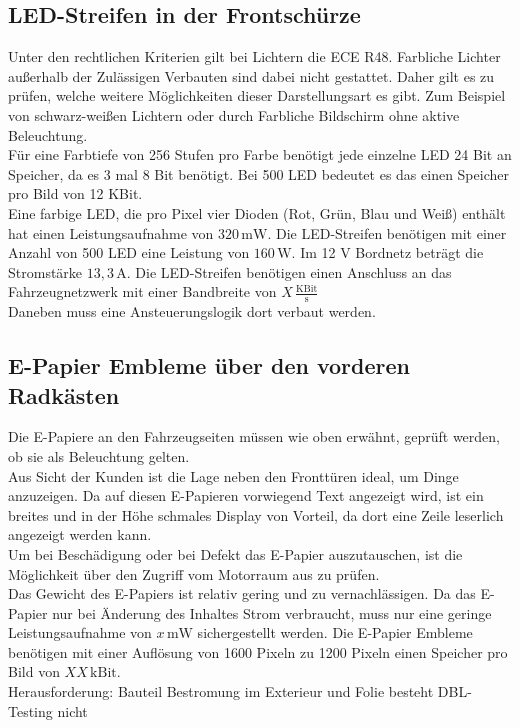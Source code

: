 \subsection{LED-Streifen in der Frontschürze}
Unter den rechtlichen Kriterien gilt bei Lichtern die ECE R48. Farbliche Lichter außerhalb der Zulässigen Verbauten sind dabei nicht gestattet. Daher gilt es zu prüfen, welche weitere Möglichkeiten dieser Darstellungsart es gibt. Zum Beispiel von schwarz-weißen Lichtern oder durch Farbliche Bildschirm ohne aktive Beleuchtung. \\
Für eine Farbtiefe von 256 Stufen pro Farbe benötigt jede einzelne LED 24 Bit an Speicher, da es 3 mal 8 Bit benötigt. Bei 500 LED bedeutet es das einen Speicher pro Bild von 12 KBit. \\
Eine farbige LED, die pro Pixel vier Dioden (Rot, Grün, Blau und Weiß) enthält hat einen Leistungsaufnahme von $ 320\,\mathrm{mW} $.  
Die LED-Streifen benötigen mit einer Anzahl von 500 LED eine Leistung von $ 160\,\mathrm{W} $. Im 12 V Bordnetz beträgt die Stromstärke $ 13,3\,\mathrm{A} $. 
Die LED-Streifen benötigen einen Anschluss an das Fahrzeugnetzwerk mit einer Bandbreite von $ X\,\frac{\mathrm{KBit}}{\mathrm{s}} $ \\
Daneben muss eine Ansteuerungslogik dort verbaut werden.
\subsection{E-Papier Embleme über den vorderen Radkästen}
Die E-Papiere an den Fahrzeugseiten müssen wie oben erwähnt, geprüft werden, ob sie als Beleuchtung gelten.\\
Aus Sicht der Kunden ist die Lage neben den Fronttüren ideal, um Dinge anzuzeigen.
Da auf diesen E-Papieren vorwiegend Text angezeigt wird, ist ein breites und in der Höhe schmales Display von Vorteil, da dort eine Zeile leserlich angezeigt werden kann. \\
Um bei Beschädigung oder bei Defekt das E-Papier auszutauschen, ist die Möglichkeit über den Zugriff vom Motorraum aus zu prüfen. \\
Das Gewicht des E-Papiers ist relativ gering und zu vernachlässigen.
Da das E-Papier nur bei Änderung des Inhaltes Strom verbraucht, muss nur eine geringe Leistungsaufnahme von $ x\,\mathrm{mW} $ sichergestellt werden.
Die E-Papier Embleme benötigen mit einer Auflösung von 1600 Pixeln zu 1200 Pixeln einen Speicher pro Bild von $ XX\,\mathrm{kBit} $. \\
Herausforderung: Bauteil Bestromung im Exterieur und
Folie besteht DBL-Testing nicht 
